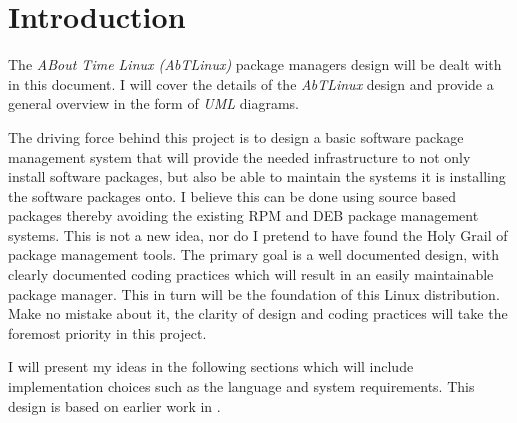 \section{Introduction}  
The \emph{ABout Time Linux (AbTLinux)} package managers design will be dealt with in
this document. I will cover the details of the \emph{AbTLinux} design and provide a general overview in the form of \emph{UML} diagrams.

The driving force behind this project is to design a basic software package management system that will provide the needed infrastructure to not only install software packages, but also be able to maintain the systems it is installing the software packages onto. I believe this can be done using source based packages thereby avoiding the existing RPM and DEB package management systems. This is not a new idea, nor do I pretend to have found the Holy Grail of package management tools. The primary goal is a well documented design, with clearly documented coding practices which will result in an easily maintainable package manager. This in turn will be the foundation of this Linux distribution. Make no mistake about it, the clarity of design and coding practices will take the foremost priority in this project.

I will present my ideas in the following sections which will include implementation choices such as the language and system requirements. This design is based on earlier work in \cite{2006-Schabell-LinuxRequirements}.
